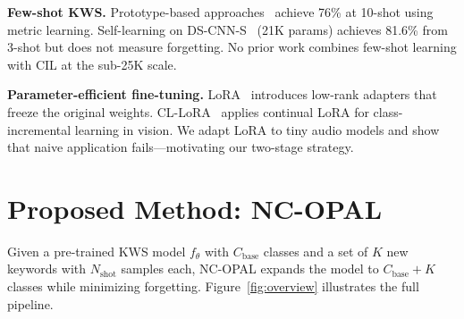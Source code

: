 \documentclass{Interspeech}
\begin{document}
\noindent\textbf{Few-shot KWS.}\quad
Prototype-based approaches~\cite{opensettinykws2023} achieve 76\% at 10-shot using metric learning.
Self-learning on DS-CNN-S~\cite{selflearn2024} (21K params) achieves 81.6\% from 3-shot but does not measure forgetting.
No prior work combines few-shot learning with CIL at the sub-25K scale.

\noindent\textbf{Parameter-efficient fine-tuning.}\quad
LoRA~\cite{hu2022lora} introduces low-rank adapters that freeze the original weights.
CL-LoRA~\cite{cllora2025} applies continual LoRA for class-incremental learning in vision.
We adapt LoRA to tiny audio models and show that naive application fails---motivating our two-stage strategy.

\section{Proposed Method: NC-OPAL}
\label{sec:method}

Given a pre-trained KWS model $f_\theta$ with $C_\text{base}$ classes and a set of $K$ new keywords with $N_\text{shot}$ samples each, NC-OPAL expands the model to $C_\text{base}{+}K$ classes while minimizing forgetting.
Figure~\ref{fig:overview} illustrates the full pipeline.
\end{document}
